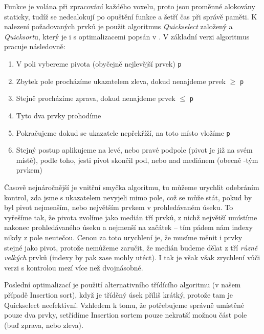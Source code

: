         Funkce je volána při zpracování každého voxelu, proto jsou proměnné alokovány staticky, tudíž se nedealokují po opuštění funkce a šetří čas při správě paměti. K nalezení požadovaných prvků je použit algoritmus \emph{Quickselect} založený a \emph{Quicksort}u, který je i s optimalizacemi popsán v \cite{Numerical Recipes}. V základní verzi algoritmus pracuje následovně:
        \begin{enumerate}
          \item V poli vybereme pivota (obyčejně nejlevější prvek) {\tt p}
          \item Zbytek pole procházíme ukazatelem zleva, dokud nenajdeme prvek $\ge$ {\tt p}
          \item Stejně procházíme zprava, dokud nenajdeme prvek $\le$ {\tt p}
          \item Tyto dva prvky prohodíme
          \item Pokračujeme dokud se ukazatele nepřekříží, na toto místo vložíme {\tt p}
          \item Stejný postup aplikujeme na levé, nebo pravé podpole (pivot je již na svém místě), podle toho, jesti pivot skončil pod, nebo nad mediánem (obecně \kk-tým prvkem)
        \end{enumerate}

        Časově nejnáročnější je vnitřní smyčka algoritmu, tu můžeme urychlit odebráním kontrol, zda jsme s ukazatelem nevyjeli mimo pole, což se může stát, pokud by byl pivot nejmenším, nebo největším prvkem v prohledávaném úseku. To vyřešíme tak, že pivota zvolíme jako medián tří prvků, z nichž největší umístíme nakonec prohledávaného úseku a nejmenší na začátek -- tím pádem nám indexy nikdy z pole neutečou. Cenou za toto urychlení je, že musíme měnit i prvky stejné jako pivot, protože nemůžeme zaručit, že medián budeme dělat z tří \emph{různě velkých} prvků (indexy by pak zase mohly utéct). I tak je však však zrychlení vůči verzi s kontrolou mezí více než dvojnásobné.

        Poslední optimalizací je použití alternativního třídícího algoritmu (v našem případě Insertion sort), když je tříděný úsek příliš krátký, protože tam je Quickselect neefektivní. Vzhledem k tomu, že potřebujeme správně umístěné pouze dva prvky, setřídíme Insertion sortem pouze nekratší možnou část pole (buď zprava, nebo zleva).

